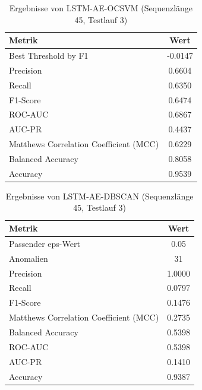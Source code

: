 \documentclass[a4paper,12pt]{article}
\begin{document}
\begin{table}[H]
	\centering
	\caption{Ergebnisse von LSTM-AE-OCSVM (Sequenzlänge 45, Testlauf 3)}
	\begin{tabular}{lc}
		\hline
		Metrik & Wert \\
		\hline
		Best Threshold by F1 & -0.0147 \\
		Precision & 0.6604 \\
		Recall & 0.6350 \\
		F1-Score & 0.6474 \\
		ROC-AUC & 0.6867 \\
		AUC-PR & 0.4437 \\
		Matthews Correlation Coefficient (MCC) & 0.6229 \\
		Balanced Accuracy & 0.8058 \\
		Accuracy & 0.9539 \\
		\hline
	\end{tabular}
\end{table}

\begin{table}[H]
	\centering
	\caption{Ergebnisse von LSTM-AE-DBSCAN (Sequenzlänge 45, Testlauf 3)}
	\begin{tabular}{lc}
		\hline
		Metrik & Wert \\
		\hline
		Passender eps-Wert & 0.05 \\
		Anomalien & 31 \\
		Precision & 1.0000 \\
		Recall & 0.0797 \\
		F1-Score & 0.1476 \\
		Matthews Correlation Coefficient (MCC) & 0.2735 \\
		Balanced Accuracy & 0.5398 \\
		ROC-AUC & 0.5398 \\
		AUC-PR & 0.1410 \\
		Accuracy & 0.9387 \\
		\hline
	\end{tabular}
\end{table}
\end{document}
